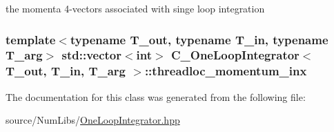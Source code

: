 the momenta 4-\/vectors associated with singe loop integration 

\hypertarget{class_c___one_loop_integrator_af7ddf02e8c2d913b2a38f6670e26ac3b}{
\subsubsection[{threadloc\-\_\-momentum\-\_\-inx}]{\setlength{\rightskip}{0pt plus 5cm}template$<$typename T\-\_\-out, typename T\-\_\-in, typename T\-\_\-arg$>$ std\-::vector$<$int$>$ {\bf C\-\_\-\-One\-Loop\-Integrator}$<$ T\-\_\-out, T\-\_\-in, T\-\_\-arg $>$\-::threadloc\-\_\-momentum\-\_\-inx\hspace{0.3cm}{\ttfamily [protected]}}}\label{class_c___one_loop_integrator_af7ddf02e8c2d913b2a38f6670e26ac3b}


The documentation for this class was generated from the following file\-:\begin{DoxyCompactItemize}
\item 
source/\-Num\-Libs/\hyperlink{_one_loop_integrator_8hpp}{One\-Loop\-Integrator.\-hpp}\end{DoxyCompactItemize}
